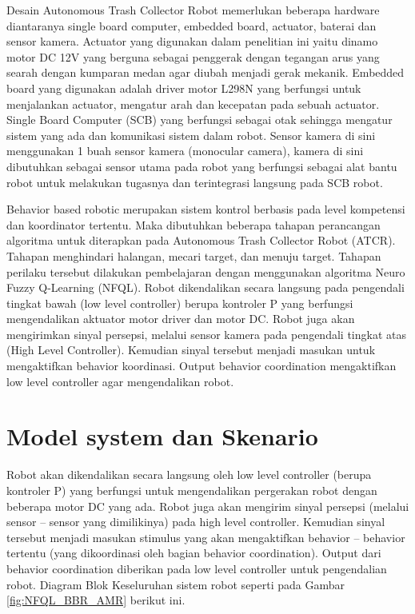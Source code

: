 Desain Autonomous Trash Collector Robot memerlukan beberapa hardware diantaranya single board computer, embedded board, actuator, baterai dan sensor kamera.
Actuator yang digunakan dalam penelitian ini yaitu dinamo motor DC 12V yang berguna sebagai penggerak dengan tegangan arus yang searah dengan kumparan medan agar diubah menjadi gerak mekanik. Embedded board yang digunakan adalah driver motor L298N yang berfungsi untuk menjalankan actuator, mengatur arah dan kecepatan pada sebuah actuator. Single Board Computer (SCB)  yang berfungsi sebagai otak sehingga mengatur sistem yang ada dan komunikasi sistem dalam robot. Sensor kamera di sini menggunakan 1 buah sensor kamera (monocular camera), kamera di sini dibutuhkan sebagai sensor utama pada robot yang berfungsi sebagai alat bantu robot untuk melakukan tugasnya dan terintegrasi langsung pada SCB robot.

Behavior based robotic merupakan sistem kontrol berbasis pada level kompetensi dan koordinator tertentu. Maka dibutuhkan beberapa tahapan perancangan algoritma untuk diterapkan pada Autonomous Trash Collector Robot (ATCR). Tahapan menghindari halangan, mecari target, dan menuju target. Tahapan perilaku tersebut dilakukan pembelajaran dengan menggunakan algoritma Neuro Fuzzy Q-Learning (NFQL).
Robot dikendalikan secara langsung pada pengendali tingkat bawah (low level controller) berupa kontroler P yang berfungsi mengendalikan aktuator motor driver dan motor DC. Robot juga akan mengirimkan sinyal persepsi, melalui sensor kamera pada pengendali tingkat atas (High Level Controller). Kemudian sinyal tersebut menjadi masukan untuk mengaktifkan behavior koordinasi. Output behavior coordination mengaktifkan low level controller agar mengendalikan  robot. 




\section{Model system dan Skenario} 
Robot akan dikendalikan secara langsung oleh low
level controller (berupa kontroler P) yang berfungsi
untuk mengendalikan pergerakan robot dengan beberapa motor DC yang ada. Robot juga akan
mengirim sinyal persepsi (melalui sensor – sensor
yang dimilikinya) pada high level controller.
Kemudian sinyal tersebut menjadi masukan stimulus
yang akan mengaktifkan behavior – behavior tertentu
(yang dikoordinasi oleh bagian behavior coordination).
Output dari behavior coordination diberikan pada low level controller untuk pengendalian robot.  Diagram Blok Keseluruhan sistem robot seperti pada Gambar \ref{fig:NFQL_BBR_AMR} berikut ini.
 
